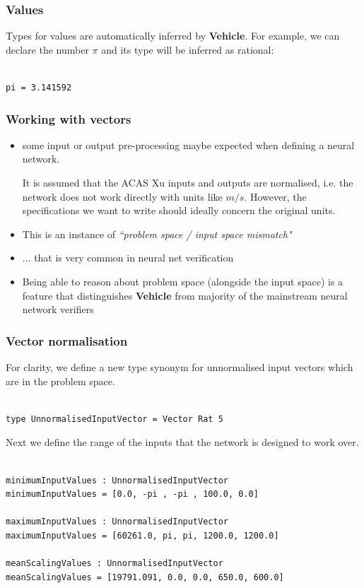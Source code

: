 \documentclass[t,compress,aspectratio=169]{beamer}
\begin{document}
\begin{frame}[fragile]
\frametitle{Values}

Types for values are automatically inferred by \textbf{Vehicle}. For example, we can declare the number $\pi$ and its type will be inferred as rational:

\begin{verbatim}

pi = 3.141592
\end{verbatim}
\end{frame}

\begin{frame}[fragile]
\frametitle{Working with vectors}
\begin{itemize}
\item some input or output pre-processing maybe expected when defining a neural network.

\begin{example}
It is assumed that the ACAS Xu inputs and outputs are normalised, i.e. the network does not work directly with units like $m/s$. However, the specifications  we want to write should ideally concern the original units.
\end{example}

\pause


\item This is an instance of \emph{``problem space / input space mismatch"}

\item ... that is very common in neural net verification

\item
Being able to reason about problem space (alongside the input space) is a feature that distinguishes \textbf{Vehicle} from
majority of the mainstream neural network verifiers
\end{itemize}
\end{frame}

\begin{frame}[fragile]
\frametitle{Vector normalisation}
\vspace{-2em}
For clarity, we define a new type synonym for unnormalised input vectors which are in the problem space.
\begin{verbatim}

type UnnormalisedInputVector = Vector Rat 5

\end{verbatim}

Next we define the range of the inputs that the network is designed
to work over.

\begin{verbatim}

minimumInputValues : UnnormalisedInputVector
minimumInputValues = [0.0, -pi , -pi , 100.0, 0.0]

maximumInputValues : UnnormalisedInputVector
maximumInputValues = [60261.0, pi, pi, 1200.0, 1200.0]

meanScalingValues : UnnormalisedInputVector
meanScalingValues = [19791.091, 0.0, 0.0, 650.0, 600.0]
\end{verbatim}
\end{frame}
\end{document}
